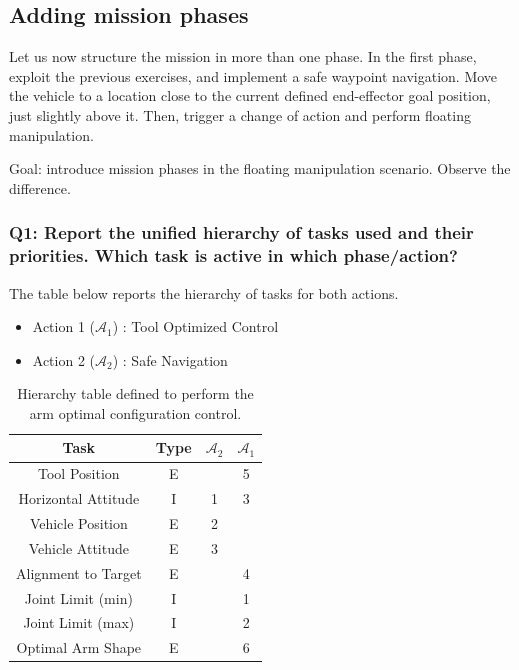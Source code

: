 \documentclass{article}
\begin{document}
\subsection{Adding mission phases}
Let us now structure the mission in more than one phase. In the first phase, exploit the previous exercises, and implement a safe waypoint navigation. Move the vehicle to a location close to the current defined end-effector goal position, just slightly above it. Then, trigger a change of action and perform floating manipulation.

Goal: introduce mission phases in the floating manipulation scenario. Observe the difference.

\subsubsection{Q1: Report the unified hierarchy of tasks used and their priorities. Which task is active in which phase/action?}
The table below reports the hierarchy of tasks for both actions. 

\begin{table}[htb]
	\caption{Hierarchy table defined to perform the arm optimal configuration control.}
	\begin{itemize}
		\item Action 1 ($\mathcal{A}_{1}$) : Tool Optimized Control
		\item Action 2 ($\mathcal{A}_{2}$) : Safe Navigation 
	\end{itemize}
	\label{tb5:ex4.1.1HierarchyTable}
	\begin{center}
		\footnotesize
		\begin{tabular}{cccc}
			\toprule
			Task & Type & $\mathcal{A}_{2}$ & $\mathcal{A}_{1}$ \\			
			\midrule
			Tool Position                   & E &    &	5	\\
			\hdashline
			Horizontal Attitude             & I & 1  &	3	\\
			\hdashline
			Vehicle Position        		& E & 2  &	 	\\
			\hdashline
			Vehicle Attitude        		& E & 3  &	 	\\
			\hdashline
			Alignment to Target           	& E &    &	4	\\
			\hdashline
			Joint Limit (min)               & I &    &	1	\\
			\hdashline
			Joint Limit (max)               & I &    &	2	\\
			\hdashline
			Optimal Arm Shape				& E &    &	6	\\
			\bottomrule
		\end{tabular}
	\end{center}
\end{table}
\end{document}
